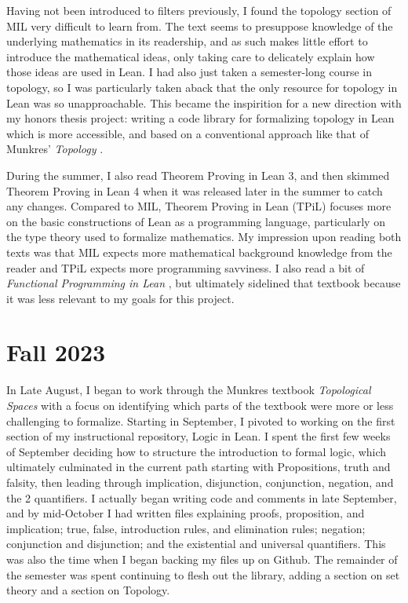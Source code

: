 Having not been introduced to filters previously, I found the
topology section of MIL very difficult to learn from. The text seems 
to presuppose knowledge of the underlying mathematics in its readership,
and as such makes little effort to introduce the mathematical ideas, 
only taking care to delicately explain how those ideas are used in Lean.
I had also just taken a semester-long course in topology, so I was particularly 
taken aback that the only resource for topology in Lean was so unapproachable.
This became the inspirition for a new direction with my honors thesis project:
writing a code library for formalizing topology in Lean \cite{GrenierLIT} which is more accessible,
and based on a conventional approach like that of Munkres' \textit{Topology} \cite{Munkres}.

During the summer, I also read Theorem Proving in Lean 3, and then
skimmed Theorem Proving in Lean 4 when it was released later in the 
summer to catch any changes. Compared to MIL, Theorem Proving in Lean (TPiL) focuses
more on the basic constructions of Lean as a programming language, particularly
on the type theory used to formalize mathematics. My impression upon reading both
texts was that MIL expects more mathematical background knowledge from the reader
and TPiL expects more programming savviness. I also read a bit of 
\textit{Functional Programming in Lean} \cite{FPiL}, but ultimately sidelined that
textbook because it was less relevant to my goals for this project. 

\section{Fall 2023}

In Late August, I began to work through the Munkres textbook
\textit{Topological Spaces} with a focus on identifying which parts
of the textbook were more or less challenging to formalize. 
Starting in September, I pivoted to working on the first section
of my instructional repository, Logic in Lean. I spent the first few 
weeks of September deciding how to structure the introduction to 
formal logic, which ultimately culminated in the current path
starting with Propositions, truth and falsity, then leading through
implication, disjunction, conjunction, negation, and the 2 quantifiers.
I actually began writing code and comments in late September, and by
mid-October I had written files explaining proofs, proposition, and
implication; true, false, introduction rules, and elimination rules;
negation; conjunction and disjunction; and the existential and 
universal quantifiers. This was also the time when I began backing 
my files up on Github. The remainder of the semester was spent 
continuing to flesh out the library, adding a section on set theory
and a section on Topology.

